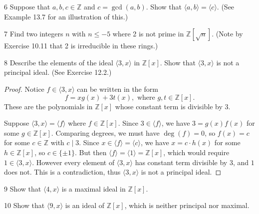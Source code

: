 \begin{problem}{6}
    Suppose that $a, b, c \in \mathbb{Z}$ and $c = \gcd(a, b)$. Show that
    $\langle a, b \rangle = \langle c \rangle$. (See Example 13.7 for an illustration of
    this.)
\end{problem}
\unsolved

\begin{problem}{7}
    Find two integers $n$ with $n \le -5$ where 2 is not prime in $\mathbb{Z}[\sqrt{n}]$.
    (Note by Exercise 10.11 that 2 is irreducible in these rings.)
\end{problem}
\unsolved

\begin{problem}{8}
    Describe the elements of the ideal $\langle 3, x \rangle$ in $\mathbb{Z}[x]$.
    Show that $\langle 3, x \rangle$ is not a principal ideal. (See Exercise 12.2.)
\end{problem}
\solved

\begin{proof}
    Notice $f \in \langle 3, x \rangle$ can be written in the form 
    \[f = x g(x) + 3 t(x), \text{ where } g, t \in \mathbb{Z}[x].\]
    These are the polynomials in $\mathbb{Z}[x]$ whose constant term is divisible by $3$.

    Suppose $\langle 3, x \rangle = \langle f \rangle$ where $f \in \mathbb{Z}[x]$.
    Since $3 \in \langle f \rangle$, we have $3 = g(x)f(x)$ for some $g \in \mathbb{Z}[x]$.
    Comparing degrees, we must have $\deg(f) = 0$, so $f(x) = c$ for some $c \in \mathbb{Z}$ with $c \mid 3$.
    Since $x \in \langle f \rangle = \langle c \rangle$, we have $x = c \cdot h(x)$ for some $h \in \mathbb{Z}[x]$,
    so $c \in \{\pm 1\}$.
    But then $\langle f \rangle = \langle 1 \rangle = \mathbb{Z}[x]$, which would require $1 \in \langle 3, x \rangle$.
    However every element of $\langle 3, x \rangle$ has constant term divisible by $3$, and $1$ does not.
    This is a contradiction, thus $\langle 3, x \rangle$ is not a principal ideal.
\end{proof}

\begin{problem}{9}
    Show that $\langle 4, x \rangle$ is a maximal ideal in $\mathbb{Z}[x]$.
\end{problem}
\unsolved

\begin{problem}{10}
    Show that $\langle 9, x \rangle$ is an ideal of $\mathbb{Z}[x]$,
        which is neither principal nor maximal.
\end{problem}
\unsolved


